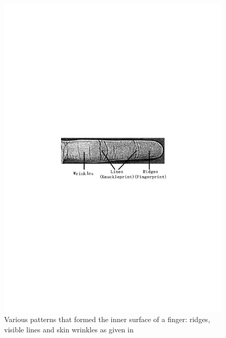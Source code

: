 \documentclass[review]{elsarticle}
\begin{document}
	\begin{figure}[!h]
		\centering
		\includegraphics[scale=.7,trim=4cm 12.5cm 4cm 12cm,clip]{FT2.pdf}
		\caption{Various patterns that formed the inner surface of a finger: ridges, visible lines and skin wrinkles as given in \cite{li2004personal}}	\label{fig:FT2}
	\end{figure}
\end{document}
